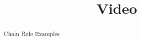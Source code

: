 \documentclass[handout]{ximera}
\title{Video}
\begin{document}
\begin{abstract}
Chain Rule Examples
\end{abstract}

\maketitle

\end{document}
